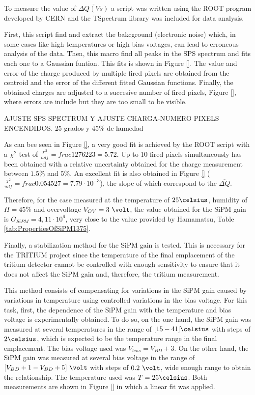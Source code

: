 To measure the value of $\overline{\Delta Q (Vs)}$ a script was written using the ROOT program \cite{ROOTWebPage} developed by CERN and the TSpectrum library was included for data analysis. 

First, this script find and extract the bakcground (electronic noise) which, in some cases like high temperatures or high bias voltages, can lead to erroneous analysis of the data. Then, this macro find all peaks in the SPS spectrum and fits each one to a Gaussian funtion. This fits is shown in Figure \ref{}. The value and error of the charge produced by multiple fired pixels are obtained from the centroid and the error of the different fitted Gaussian functions. Finally, the obtained charges are adjusted to a succesive number of fired pixels, Figure \ref{}, where errors are include but they are too small to be visible.

AJUSTE SPS SPECTRUM Y AJUSTE CHARGA-NUMERO PIXELS ENCENDIDOS. 25 grados y 45\% de humedad

As can bee seen in Figure \ref{}, a very good fit is achieved by the ROOT script with a $\chi^2$ test of $\frac{\chi^2}{ndf}=frac{1276}{223}=5.72$. Up to 10 fired pixels simultaneously has been obtained with a relative uncertainty obtained for the charge measurement between $1.5\%$ and $5\%$. An excellent fit is also obtained in Figure \ref{} ($\frac{\chi^2}{ndf}=frac{0.05452}{7}=7.79\cdot{}10^{-3}$), the slope of which correspond to the $\overline{\Delta Q}$.

Therefore, for the case measured at the temperature of $25\celsius$, humidity of $H=45\%$ and overvoltage $V_{OV}=3~\volt$, the value obtained for the SiPM gain is $G_{SiPM}=4,11\cdot{} 10^{6}$, very close to the value provided by Hamamatsu, Table \ref{tab:PropertiesOfSiPM1375}.

Finally, a stabilization method for the SiPM gain is tested. This is necessary for the TRITIUM project since the temperature of the final emplacement of the tritium detector cannot be controlled with enough sensitivity to ensure that it does not affect the SiPM gain and, therefore, the tritium measurement. 

This method consists of compensating for variations in the SiPM gain caused by variations in temperature using controlled variations in the bias voltage. For this task, first, the dependence of the SiPM gain with the temperature and bias voltage is experimentally obtained. To do so, on the one hand, the SiPM gain was measured at several temperatures in the range of $[15-41]\celsius$ with steps of $2\celsius$, which is expected to be the temperature range in the final emplacement. The bias voltage used was $V_{bias} = V_{BD}+3$. On the other hand, the SiPM gain was measured at several bias voltage in the range of $[V_{BD}+1-V_{BD}+5]~\volt$ with steps of $0.2~\volt$, wide enough range to obtain the relationship. The temperature used was $T=25\celsius$. Both measurements are shown in Figure \ref{} in which a linear fit was applied. 

